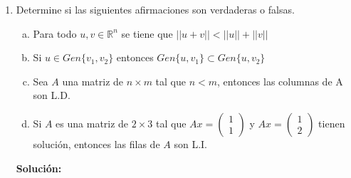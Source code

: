 \documentclass[12pt]{article}
\newenvironment{solucion}
{\begin{mdframed}[backgroundcolor=black!10]
		{\bf Solución:}\\
	}
	{
	\end{mdframed}
}
\newenvironment{preguntas}
{\begin{enumerate}\itemsep12pt
	}
	{
	\end{enumerate}
}
\newcommand{\R}{\mathbb{R}}
\begin{document}
\begin{preguntas}
\begin{solucion}
$$\begin{pmatrix}
1\\
0\\
1\\
-2
\end{pmatrix} = 
\begin{pmatrix}
0\\
1\\
1\\
-2
\end{pmatrix} +
(x_1 + 3x_3) \begin{pmatrix}
1\\
0\\
1\\
-2
\end{pmatrix}
$$
{\small Esto corresponde a la ecuación de una recta con dirección $\begin{pmatrix}
1\\
0\\
1\\
-2
\end{pmatrix}$ y que pasa por $\begin{pmatrix}
0\\
1\\
1\\
-2
\end{pmatrix}$.}
\end{solucion}
\item Determine si las siguientes afirmaciones son verdaderas o falsas.
\begin{enumerate}[a)]
\item Para todo $u, v \in \R^n$ se tiene que $||u+v|| < ||u||+||v||$
\item Si $u \in Gen\{v_1, v_2\}$ entonces $Gen\{u, v_1\} \subset Gen\{u, v_2\}$
\item Sea $A$ una matriz de $n \times m$ tal que $n < m $, entonces las columnas de A son L.D.
\item Si $A$ es una matriz de $2 \times 3$ tal que $Ax = \begin{pmatrix}
		1\\
		1
		\end{pmatrix}$ y $ Ax = \begin{pmatrix}
		1\\
		2
		\end{pmatrix}$ tienen solución, entonces las filas de $A$ son L.I.
\end{enumerate}
\begin{solucion}


\end{solucion}
\end{preguntas}
\end{document}
